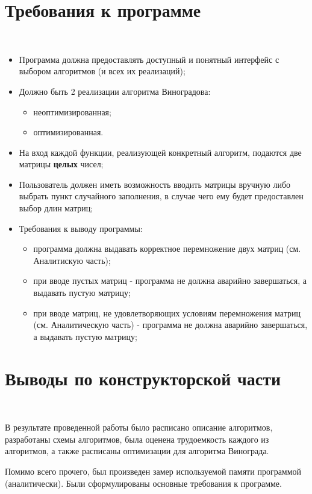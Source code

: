\documentclass[12pt]{report}
\begin{document}
	\section{Требования к программе}
	
	~\
	
	\begin{itemize}
		\item Программа должна предоставлять доступный и понятный интерфейс с выбором алгоритмов (и всех их реализаций);
		\item Должно быть 2 реализации алгоритма Виноградова:
		\begin{itemize}
			\item неоптимизированная;
			\item оптимизированная.
		\end{itemize}
		\item На вход каждой функции, реализующей конкретный алгоритм, подаются две матрицы {\bf целых} чисел;
		\item Пользователь должен иметь возможность вводить матрицы вручную либо выбрать пункт случайного заполнения, в случае чего ему будет предоставлен выбор длин матриц;	
		\item Требования к выводу программы:
		\begin{itemize}
			\item программа должна выдавать корректное перемножение двух матриц (см. Аналитискую часть);
			\item при вводе пустых матриц - программа не должна аварийно завершаться, а выдавать пустую матрицу;
			\item при вводе матриц, не удовлетворяющих условиям перемножения матриц (см. Аналитическую часть) - программа не должна аварийно завершаться, а выдавать пустую матрицу;
		\end{itemize}
	\end{itemize}
	
	
	\section{Выводы по конструкторской части}
	
	~\
	
	В результате проведенной работы было расписано описание алгоритмов, разработаны схемы алгоритмов, была оценена трудоемкость каждого из алгоритмов, а также расписаны оптимизации для алгоритма Винограда.
	
	Помимо всего прочего, был произведен замер используемой памяти программой (аналитически). Были сформулированы основные требования к программе.
	
\end{document}
